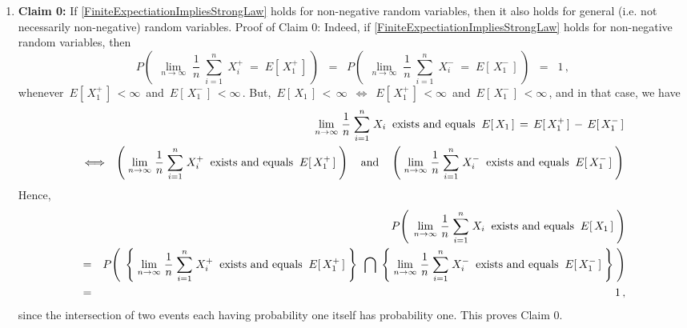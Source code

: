 \begin{enumerate}
\item

\noindent
\textbf{Claim 0:}\quad
If \eqref{FiniteExpectiationImpliesStrongLaw} holds for non-negative random variables,
then it also holds for general (i.e. not necessarily non-negative) random variables.
\vskip 0.3cm
\noindent
Proof of Claim 0:\quad
Indeed, if \eqref{FiniteExpectiationImpliesStrongLaw} holds for non-negative random variables, then
\begin{equation*}
P\!\left(\;\,
	\underset{n\rightarrow\infty}{\lim}\;
	\dfrac{1}{n}\;\overset{n}{\underset{i=1}{\sum}}\;X_{i}^{+} \;=\; E[\,X_{1}^{+}\,]
	\,\right)
\;\; = \;\;
	P\!\left(\;\,
		\underset{n\rightarrow\infty}{\lim}\;
		\dfrac{1}{n}\;\overset{n}{\underset{i=1}{\sum}}\;X_{i}^{-} \;=\; E[\,X_{1}^{-}\,]
		\,\right)
\;\; = \;\; 1\,,
\end{equation*}
whenever \,$E[\,X_{1}^{+}\,] \, < \infty$\, and \,$E[\,X_{1}^{-}\,] \, < \infty$\,.
But, \,$E[\,X_{1}\,] \,<\, \infty$\, $\Longleftrightarrow$ \,$E[\,X_{1}^{+}\,] \, < \infty$\, and \,$E[\,X_{1}^{-}\,] \, < \infty$\,,
and in that case, we have
\begin{eqnarray*}
&&
	\underset{n\rightarrow\infty}{\lim}\;
		\dfrac{1}{n}\;\overset{n}{\underset{i=1}{\sum}}\;X_{i}
		\;\;\textnormal{exists and equals}\;\;
		E[\,X_{1}\,] \,=\, E[\,X_{1}^{+}\,] \, - \, E[\,X_{1}^{-}\,]
\\
& \Longleftrightarrow &
	\left(\;
		\underset{n\rightarrow\infty}{\lim}\;
		\dfrac{1}{n}\;\overset{n}{\underset{i=1}{\sum}}\;X_{i}^{+}
		\;\;\textnormal{exists and equals}\;\;
		E[\,X_{1}^{+}\,]
		\;\right)
	\quad\textnormal{and}\quad
	\left(\;
		\underset{n\rightarrow\infty}{\lim}\;
		\dfrac{1}{n}\;\overset{n}{\underset{i=1}{\sum}}\;X_{i}^{-}
		\;\;\textnormal{exists and equals}\;\;
		E[\,X_{1}^{-}\,]
		\;\right)
\end{eqnarray*}
Hence,
\begin{eqnarray*}
&&
	P\!\left(\;\,
		\underset{n\rightarrow\infty}{\lim}\;
		\dfrac{1}{n}\;\overset{n}{\underset{i=1}{\sum}}\;X_{i}
		\;\;\textnormal{exists and equals}\;\;
		E[\,X_{1}\,]
		\;\right)
\\
& = &
	P\!\left(\;\,
		\left\{\;
			\underset{n\rightarrow\infty}{\lim}\;
			\dfrac{1}{n}\;\overset{n}{\underset{i=1}{\sum}}\;X_{i}^{+}
			\;\;\textnormal{exists and equals}\;\;
			E[\,X_{1}^{+}\,]
			\;\right\}
	\;\,\bigcap\;
		\left\{\;
			\underset{n\rightarrow\infty}{\lim}\;
			\dfrac{1}{n}\;\overset{n}{\underset{i=1}{\sum}}\;X_{i}^{-}
			\;\;\textnormal{exists and equals}\;\;
			E[\,X_{1}^{-}\,]
			\;\right\}
		\;\right)
\\
& = &
	1\,,
\end{eqnarray*}
since the intersection of two events each having probability one itself has probability one.
This proves Claim 0.


\end{enumerate}
